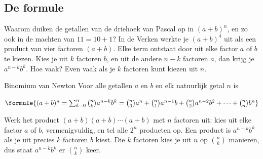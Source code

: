 \subsection{De formule}

Waarom duiken de getallen van de driehoek van Pascal op in $(a + b)^n$, en zo ook in de machten van $11 = 10 + 1$? In de Verken werkte je $(a + b)^4$ uit als een product van vier factoren $(a + b)$. Elke term ontstaat door uit elke factor $a$ of $b$ te kiezen. Kies je uit $k$ factoren $b$, en uit de andere $n - k$ factoren $a$, dan krijg je $a^{n - k}b^k$. Hoe vaak? Even vaak als je $k$ factoren kunt kiezen uit $n$.

\begin{theorie}
\begin{stelling}{Binomium van Newton}
Voor alle getallen $a$ en $b$ en elk natuurlijk getal $n$ is

\vspace{1mm}
\qquad $\formule{(a + b)^n = \sum_{k=0}^{n} \binom{n}{k} a^{n - k} b^k = \binom{n}{0}a^n + \binom{n}{1}a^{n - 1}b + \binom{n}{2}a^{n - 2}b^2 + \cdots + \binom{n}{n}b^n}$
\end{stelling}

\begin{bewijs}
Werk het product $(a + b)(a + b) \cdots (a + b)$ met $n$ factoren uit: kies uit elke factor $a$ of $b$, vermenigvuldig, en tel alle $2^n$ producten op. Een product is $a^{n - k}b^k$ als je uit precies $k$ factoren $b$ kiest. Die $k$ factoren kies je uit $n$ op $\binom{n}{k}$ manieren, dus staat $a^{n - k}b^k$ er $\binom{n}{k}$ keer.
\end{bewijs}
\end{theorie}


